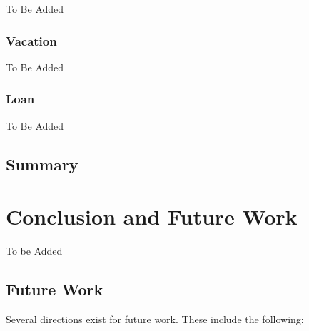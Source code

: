 \documentclass[12pt,english]{report}
\begin{document}
To Be Added

\subsection{Vacation}

To Be Added

\subsection{Loan}

To Be Added

\section{Summary}


\chapter{Conclusion and Future Work}\label{chap:conclusion}

To be Added

\section{Future Work}

Several directions exist for future work. These include the following:

\newpage
{}



\end{document}

